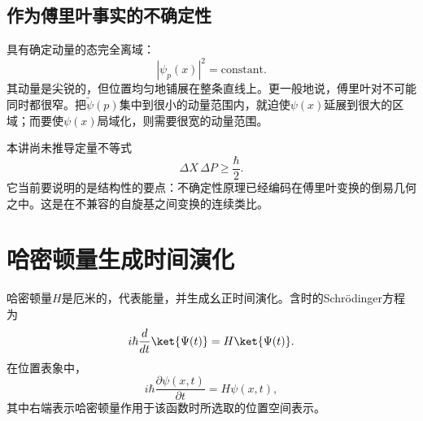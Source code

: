 \begin{classroomqa}
\end{classroomqa}

\begin{classroomqa}
\end{classroomqa}

\begin{classroomqa}
\end{classroomqa}

\subsection{作为傅里叶事实的不确定性}

具有确定动量的态完全离域：
\begin{equation}
|\psi_p(x)|^2=\text{constant}.
\end{equation}
其动量是尖锐的，但位置均匀地铺展在整条直线上。更一般地说，傅里叶对不可能同时都很窄。把\(\widetilde{\psi}(p)\)集中到很小的动量范围内，就迫使\(\psi(x)\)延展到很大的区域；而要使\(\psi(x)\)局域化，则需要很宽的动量范围。

本讲尚未推导定量不等式
\begin{equation}
\Delta X\,\Delta P\geq\frac{\hbar}{2}.
\end{equation}
它当前要说明的是结构性的要点：不确定性原理已经编码在傅里叶变换的倒易几何之中。这是在不兼容的自旋基之间变换的连续类比。

\section{哈密顿量生成时间演化}

哈密顿量\(H\)是厄米的，代表能量，并生成幺正时间演化。含时的Schr\"odinger方程为
\begin{equation}
i\hbar\frac{d}{dt}\ket{\Psi(t)}
=
H\ket{\Psi(t)}.
\label{eq:l9-abstract-schrodinger}
\end{equation}
在位置表象中，
\begin{equation}
i\hbar\frac{\partial\psi(x,t)}{\partial t}
=
H\psi(x,t),
\label{eq:l9-position-schrodinger}
\end{equation}
其中右端表示哈密顿量作用于该函数时所选取的位置空间表示。

